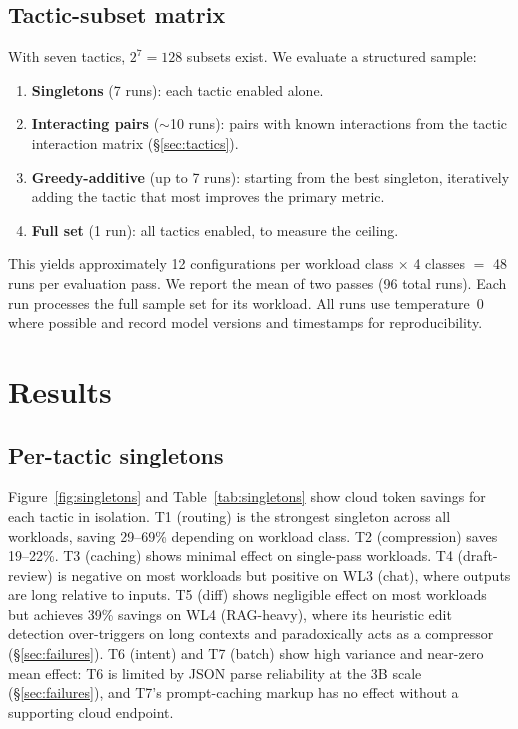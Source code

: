 \documentclass[11pt,a4paper]{article}
\begin{document}
\subsection{Tactic-subset matrix}
\label{sec:matrix}

With seven tactics, $2^7 = 128$ subsets exist. We evaluate a structured
sample:

\begin{enumerate}
  \item \textbf{Singletons} (7 runs): each tactic enabled alone.
  \item \textbf{Interacting pairs} ($\sim$10 runs): pairs with known
    interactions from the tactic interaction matrix
    (\S\ref{sec:tactics}).
  \item \textbf{Greedy-additive} (up to 7 runs): starting from the
    best singleton, iteratively adding the tactic that most improves
    the primary metric.
  \item \textbf{Full set} (1 run): all tactics enabled, to measure
    the ceiling.
\end{enumerate}

This yields approximately 12 configurations per workload class
$\times$ 4 classes $=$ 48 runs per evaluation pass. We report the
mean of two passes (96 total runs). Each run processes the full
sample set for its workload. All runs use temperature~0 where
possible and record model versions and timestamps for
reproducibility.

\section{Results}
\label{sec:results}

\subsection{Per-tactic singletons}

Figure~\ref{fig:singletons} and Table~\ref{tab:singletons} show cloud
token savings for each tactic in isolation. T1 (routing) is the strongest
singleton across all workloads, saving 29--69\% depending on workload
class. T2 (compression) saves 19--22\%. T3 (caching) shows minimal
effect on single-pass workloads. T4 (draft-review) is negative on most
workloads but positive on WL3 (chat), where outputs are long relative to
inputs. T5 (diff) shows negligible effect on most workloads but
achieves 39\% savings on WL4 (RAG-heavy), where its heuristic edit
detection over-triggers on long contexts and paradoxically acts as a
compressor (\S\ref{sec:failures}). T6 (intent) and T7 (batch) show
high variance and near-zero mean effect: T6 is limited by JSON parse
reliability at the 3B scale (\S\ref{sec:failures}), and T7's
prompt-caching markup has no effect without a supporting cloud
endpoint.
\end{document}
